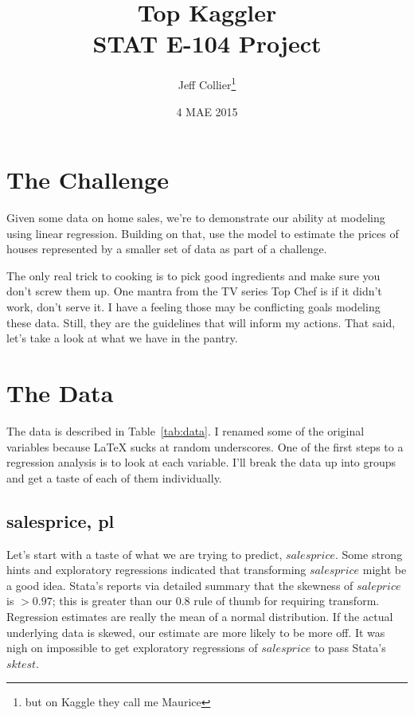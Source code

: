 \documentclass[twocolumn,11pt]{article}
\title{Top Kaggler\\STAT E-104 Project}
\author{Jeff Collier\footnote{but on Kaggle they call me Maurice}}
\date{4 MAE 2015}
\begin{document}
\maketitle


\section*{The Challenge}
Given some data on home sales, we're to demonstrate our ability at modeling using linear regression.
Building on that, use the model to estimate the prices of houses represented by a smaller set of data
as part of a challenge.

The only real trick to cooking is to pick good ingredients and make sure you don't screw them up.
One mantra from the TV series Top Chef is if it didn't work, don't serve it.
I have a feeling those may be conflicting goals modeling these data.
Still, they are the guidelines that will inform my actions.
That said, let's take a look at what we have in the pantry.


\section*{The Data}
The data is described in Table~\ref{tab:data}.
I renamed some of the original variables because \LaTeX{} sucks at random underscores.
One of the first steps to a regression analysis is to look at each variable.
I'll break the data up into groups and get a taste of each of them individually.


\subsection*{salesprice, pl}
Let's start with a taste of what we are trying to predict, $salesprice$.
Some strong hints and exploratory regressions
indicated that transforming $salesprice$ might be a good idea.
Stata's reports via detailed summary that the skewness of $saleprice$ is $>0.97$;
this is greater than our $0.8$ rule of thumb for requiring transform.
Regression estimates are really the mean of a normal distribution.
If the actual underlying data is skewed, our estimate are more likely to be more off.
It was nigh on impossible to get exploratory regressions of $salesprice$ to pass Stata's $sktest$.
\end{document}
